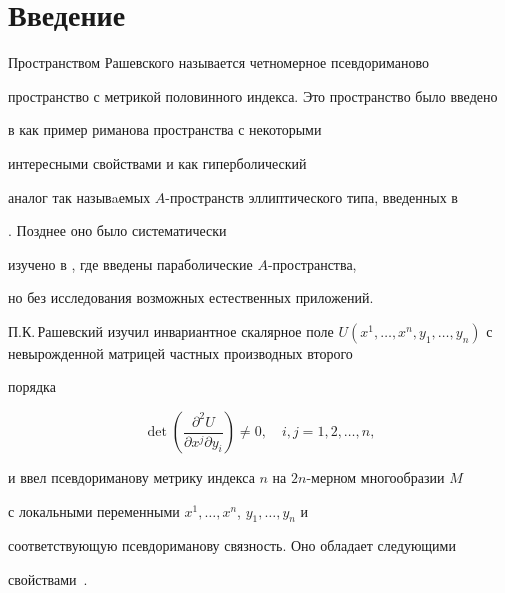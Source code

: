 \label{begin}











\section{Введение}





Пространством Рашевского называется четномерное псевдориманово


пространство с метрикой половинного индекса. Это пространство было введено


в \cite{ar1} как пример риманова пространства с некоторыми


интересными свойствами и как гиперболический


аналог так назывaемых $A$-пространств эллиптического типа, введенных в


\cite{ar2}. Позднее оно было систематически


изучено в \cite{ar3}, где введены параболические $A$-пространства,


но без исследования возможных естественных приложений.





П.К.\,Рашевский изучил инвариантное скалярное поле $U(x^1,\dotsc, x^n,


y_1, \dotsc, y_n)$ с невырожденной матрицей частных производных второго


порядка


$$


\det\left(\frac{\partial^2U}{\partial x^j\partial y_i}\right)\neq


0,\quad i, j = 1, 2, \dotsc, n,


$$


и ввел псевдориманову метрику индекса $n$ на $2n$-мерном многообразии $M$


с локальными переменными $x^1,\dotsc, x^n$, $y_1, \dotsc, y_n$ и


соответствующую псевдориманову связность. Оно обладает следующими


свойствами~\cite{ar1}.


